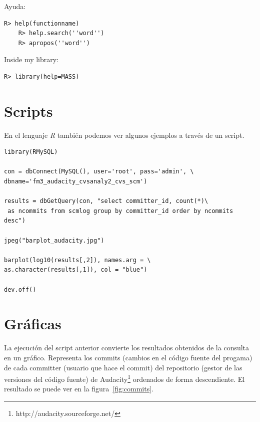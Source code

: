 \documentclass[11pt]{scrartcl}
\begin{document}
Ayuda:

\begin{lstlisting}[style=Shell]
	R> help(functionname)
	R> help.search(''word'')
	R> apropos(''word'')
\end{lstlisting}

Inside my library:

\begin{lstlisting}[style=Shell]
	R> library(help=MASS)
\end{lstlisting}

\section{Scripts}

En el lenguaje \emph{R} tambi\'en podemos ver algunos ejemplos a través de un script.

\begin{lstlisting}
library(RMySQL)

con = dbConnect(MySQL(), user='root', pass='admin', \
dbname='fm3_audacity_cvsanaly2_cvs_scm')

results = dbGetQuery(con, "select committer_id, count(*)\
 as ncommits from scmlog group by committer_id order by ncommits desc")

jpeg("barplot_audacity.jpg")

barplot(log10(results[,2]), names.arg = \
as.character(results[,1]), col = "blue")

dev.off()
\end{lstlisting}

\section{Gr\'aficas}

La ejecuci\'on del script anterior convierte los resultados obtenidos de la consulta en un gr\'afico. Representa los commits (cambios en el c\'odigo fuente del progama) de cada committer (usuario que hace el commit) del repositorio (gestor de las versiones del c\'odigo fuente) de Audacity\footnote{http://audacity.sourceforge.net/} ordenados de forma descendiente. El resultado se puede ver en la figura~\ref{fig:commits}.
\end{document}
